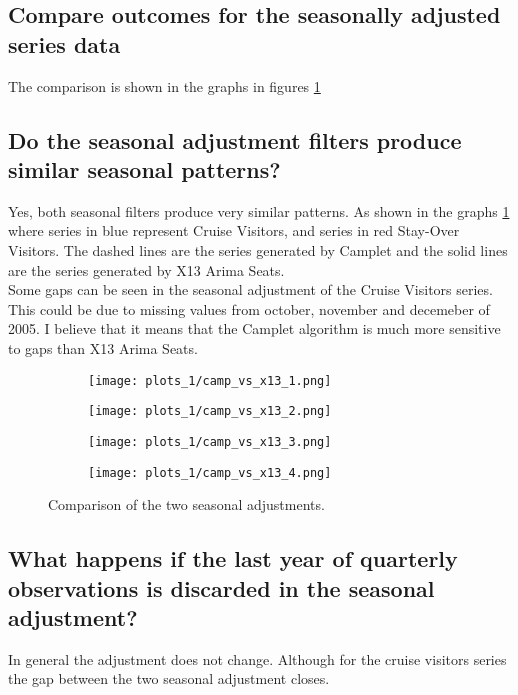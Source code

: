 \documentclass[11pt]{article}
\begin{document}
\newpage
\subsection{Compare outcomes for the seasonally adjusted series data}
The comparison is shown in the graphs in figures \ref{fig:campletx13d}

\subsection{Do the seasonal adjustment filters produce similar seasonal patterns?} 
Yes, both seasonal filters produce very similar patterns. As shown in the graphs \ref{fig:campletx13d} where series in blue represent Cruise Visitors, and series in red Stay-Over Visitors. The dashed lines are the series generated by Camplet and the solid lines are the series generated by X13 Arima Seats.\\

Some gaps can be seen in the seasonal adjustment of the Cruise Visitors series. This could be due to missing values from october, november and decemeber of 2005. I believe that it means that the Camplet algorithm is much more sensitive to gaps than X13 Arima Seats.

\begin{figure}[H]
    \centering
    \begin{subfigure}[t]{0.45\textwidth}
         \texttt{[image: plots\_1/camp\_vs\_x13\_1.png]}
    \end{subfigure}
    \begin{subfigure}[t]{0.45\textwidth}
          \texttt{[image: plots\_1/camp\_vs\_x13\_2.png]}
    \end{subfigure}
    \begin{subfigure}[t]{0.45\textwidth}
         \texttt{[image: plots\_1/camp\_vs\_x13\_3.png]}
    \end{subfigure}
    \begin{subfigure}[t]{0.45\textwidth}
          \texttt{[image: plots\_1/camp\_vs\_x13\_4.png]}
    \end{subfigure}
    \caption{Comparison of the two seasonal adjustments.\label{fig:campletx13d}}
\end{figure}

\subsection{What happens if the last year of quarterly observations is discarded in the seasonal adjustment?}
In general the adjustment does not change. Although for the cruise visitors series the gap between the two seasonal adjustment closes.
\end{document}
